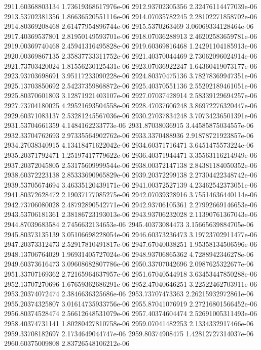 {2911.60368803134 1.73619368617976e-06
2912.93702305356 2.32476114477039e-06
2913.53702381356 1.86636520551116e-06
2914.07035782245 2.28102271858702e-06
2914.80369208468 2.61477954896744e-06
2915.5370263469 3.06069334128464e-06
2917.40369537801 2.81950149593701e-06
2918.07036288913 2.46202583659781e-06
2919.00369740468 2.45941316495828e-06
2919.60369816468 1.24291104185913e-06
2920.00369867135 2.35837733311752e-06
2921.40370044469 2.73062096024914e-06
2921.73703420024 1.81556230125431e-06
2923.07036922247 1.64360419073177e-06
2923.93703698691 3.95117233090228e-06
2924.80370475136 3.78278369947351e-06
2925.13703850692 2.54237359868872e-06
2925.40370551136 2.55292189461051e-06
2925.80370601803 3.12871921403107e-06
2927.07037428914 2.58339129694257e-06
2927.73704180025 4.29521693504558e-06
2928.47037606248 3.86972276320447e-06
2929.60371083137 2.53281245567036e-06
2930.27037834248 3.70734236501391e-06
2931.53704661359 4.1484162233773e-06
2931.87038036915 3.44585875034557e-06
2932.33704762693 2.97335564902762e-06
2933.3370488936 2.91878721923857e-06
2934.27038340915 4.13418471622042e-06
2934.60371716471 3.6451475573224e-06
2935.20371792471 1.25197417779622e-06
2936.40371944471 3.35563116214949e-06
2937.20372045805 2.53175609999544e-06
2938.00372147138 2.84381184050352e-06
2938.60372223138 2.85333690965829e-06
2939.20372299138 2.27304422348742e-06
2939.53705674694 3.46335120439171e-06
2941.00372527139 4.23462542373051e-06
2941.80372628472 2.19037177085275e-06
2942.07039328916 3.75514636440114e-06
2942.73706080028 2.48792890542771e-06
2942.93706105361 2.27992669146653e-06
2943.53706181361 2.38186723193013e-06
2943.93706232028 2.11390761367043e-06
2944.87039683584 2.7456632134653e-06
2945.40373084473 3.15665639884705e-06
2945.80373135139 3.05106698228054e-06
2946.60373236473 3.19723702911477e-06
2947.20373312473 2.52917810491817e-06
2947.67040038251 1.95358134506596e-06
2948.13706764029 1.96931405727024e-06
2948.93706865362 4.7288942346278e-06
2949.60373616473 3.09608682807786e-06
2950.33707042696 2.0987625322677e-06
2951.33707169362 2.72165964637957e-06
2951.67040544918 3.63453447850288e-06
2952.13707270696 1.67659362686291e-06
2952.47040646251 3.22522462703911e-06
2953.20374072474 2.3846636325686e-06
2953.73707473363 2.26215932972861e-06
2955.20374325807 3.01614735933756e-06
2955.87041076919 2.27216801566452e-06
2956.80374528474 2.56612648531079e-06
2957.40374604474 2.52691005311493e-06
2958.40374731141 1.80280427810758e-06
2959.07041482253 2.1334332917466e-06
2959.33708182697 2.1734649044747e-06
2959.80374908475 1.42812727314037e-06
2960.60375009808 2.83726548106212e-06
}
